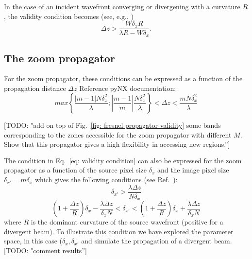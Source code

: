 \documentclass{iucr}              %
\newcommand{\todo}[1]{{\color{red}[TODO: "#1'']}}
\newcommand{\inred}[1]{{\color{red}#1}}
\begin{document}
In the case of an incident wavefront converging or divergening with a curvature $R$, the validity condition becomes (see, e.g., \cite{schmidt})
\begin{equation}
\Delta z > \frac{W \delta_x R}{\lambda R - W \delta_x}.
\end{equation}


\subsection{The zoom propagator}

For the zoom propagator, these conditions can be expressed as a function of the propagation distance $\Delta z$ \inred{Reference pyNX documentation}:
\begin{equation}\label{eq: validity zoom pynx}
max\left\{ \frac{|m-1| N \delta_x^2}{\lambda}; \left| \frac{m-1}{m} \right|\frac{N \delta_x^2}{\lambda} \right\} < \Delta z < \frac{m N \delta_x^2}{\lambda}
\end{equation}

\todo{add on top of Fig.~\ref{fig: fresnel propagator validity} some bands corresponding to the zones accessible for the zoom propagator with different $M$. Show that this propagator gives a high flexibility in accessing new regions.} 

The condition in Eq.~\ref{eq: validity condition} can also be expressed for the zoom propagator as a function of the source pixel size $\delta_x$ and the image pixel size $\delta_{x'}=m \delta_x$ which gives the following conditions (see Ref.~\cite{pirro}):
\begin{equation}\label{eq: validity pirro condition one}
\delta_{x'} > \frac{\lambda \Delta z}{N \delta_x}
\end{equation}
\begin{equation}\label{eq: validity pirro condition two}
\left(1+\frac{\Delta z}{R}\right) \delta_x -
\frac{\lambda \Delta z}{\delta_x N}
< \delta_{x'} < 
\left( 1 + \frac{\Delta z}{R}\right) \delta_x + \frac{\lambda \Delta z}{\delta_x N}
\end{equation}
where $R$ is the dominant curvature of the source wavefront (positive for a divergent beam). To illustrate this condition we have explored the parameter space, in this case ($\delta_x,\delta_{x'}$ and simulate the propagation of a divergent beam. \todo{comment results}
\end{document}
